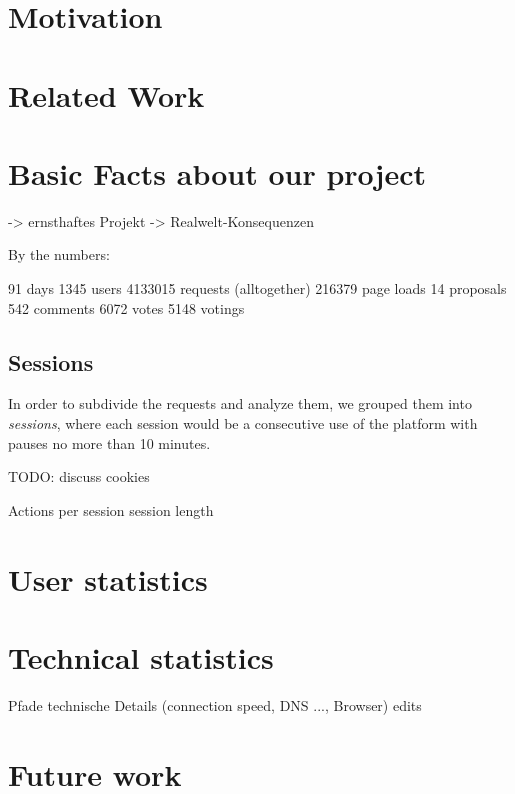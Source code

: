 



\section{Motivation}
\section{Related Work}
\section{Basic Facts about our project}

	-> ernsthaftes Projekt
	-> Realwelt-Konsequenzen

By the numbers:

91 days
1345 users
4133015 requests (alltogether)
216379 page loads
14 proposals
542 comments
6072 votes
5148 votings

\subsection{Sessions}

In order to subdivide the requests and analyze them, we grouped them into \textit{sessions}, where each session would be a consecutive use of the platform with pauses no more than 10 minutes.


TODO: discuss cookies

Actions per session
session length


\section{User statistics}



\section{Technical statistics}

Pfade
technische Details (connection speed, DNS ..., Browser)
edits

\section{Future work}
